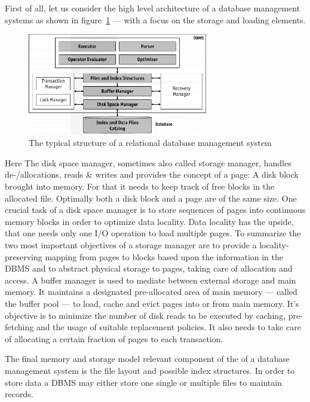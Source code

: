 \documentclass[a4paper,10pt]{article}
\begin{document}
First of all, let us consider the high level architecture of a database management systems as shown in figure~\ref{dbms_arch} --- with a focus on the storage and loading elements.

\begin{figure}[htp]\label{dbms_arch}
 \begin{center}
  \includegraphics[keepaspectratio,width=0.7\textwidth]{img/RDBMS.png}
 \end{center}
 \caption{The typical structure of a relational database management system } %
\end{figure}

Here The disk space manager, sometimes also called storage manager, handles de-/allocations, reads \& writes and provides the concept of a page: A disk block brought into memory. For that it needs to keep track of free blocks in the allocated file. Optimally both a disk block and a page are of the same size. One crucial task of a disk space manager is to store sequences of pages into continuous memory blocks in order to optimize data locality. Data locality has the upside, that one needs only one I/O operation to load multiple pages. To summarize the two most important objectives of a storage manager are to provide a locality-preserving mapping from pages to blocks based upon the information in the DBMS and to abstract physical storage to pages, taking care of allocation and access.
A buffer manager is used to mediate between external storage and main memory. It maintains a designated pre-allocated area of main memory --- called the buffer pool --- to load, cache and evict pages into or from main memory. It's objective is to minimize the number of disk reads to be executed by caching, pre-fetching and the usage of suitable replacement policies. It also needs to take care of allocating a certain fraction of pages to each transaction.

The final memory and storage model relevant component of the  of a database management system is the file layout and possible index structures. 
In order to store data a DBMS may either store one single or multiple files to maintain records. 
\end{document}

